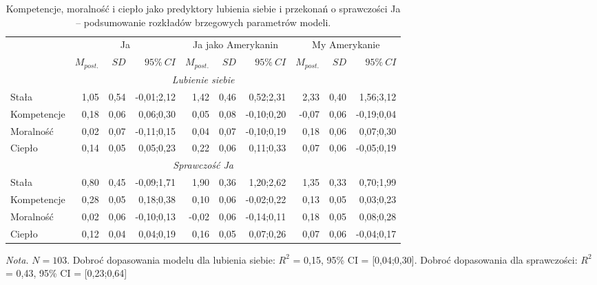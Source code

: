 \documentclass[man]{apa6}
\begin{document}
\begin{table*}[htbp]
\vspace*{2em}
\centering
\begin{threeparttable}
\caption{Kompetencje, moralność i ciepło jako predyktory lubienia siebie i przekonań o sprawczości Ja -- podsumowanie rozkładów brzegowych parametrów modeli.}
\label{tab:2}
\bgroup
\def\tabcolsep{4pt}
\begin{tabular}{lrrrrrrrrr}
\midrule
 &
\multicolumn{3}{c}{Ja} &
\multicolumn{3}{c}{Ja jako Amerykanin} &
\multicolumn{3}{c}{My Amerykanie} \\
\cline{2-10}
 & $M_{post.}$    & $SD$   & $95\%\ CI$   & $M_{post.}$    & $SD$   & $95\%\ CI$   & $M_{post.}$    & $SD$   & $95\%\ CI$   \\
\midrule
 \multicolumn{10}{c}{\emph{Lubienie siebie}}  \\
 Stała       &  1,05 & 0,54 & -0,01;2,12 &  1,42 & 0,46 &  0,52;2,31 &  2,33 & 0,40 &  1,56;3,12 \\
 Kompetencje &  0,18 & 0,06 &  0,06;0,30 &  0,05 & 0,08 & -0,10;0,20 & -0,07 & 0,06 & -0,19;0,04 \\
 Moralność   &  0,02 & 0,07 & -0,11;0,15 &  0,04 & 0,07 & -0,10;0,19 &  0,18 & 0,06 &  0,07;0,30 \\
 Ciepło      &  0,14 & 0,05 &  0,05;0,23 &  0,22 & 0,06 &  0,11;0,33 &  0,07 & 0,06 & -0,05;0,19 \\
 \multicolumn{10}{c}{\emph{Sprawczość Ja}}  \\
 Stała       &  0,80 & 0,45 & -0,09;1,71 &  1,90 & 0,36 &  1,20;2,62 &  1,35 & 0,33 &  0,70;1,99 \\
 Kompetencje &  0,28 & 0,05 &  0,18;0,38 &  0,10 & 0,06 & -0,02;0,22 &  0,13 & 0,05 &  0,03;0,23 \\
 Moralność   &  0,02 & 0,06 & -0,10;0,13 & -0,02 & 0,06 & -0,14;0,11 &  0,18 & 0,05 &  0,08;0,28 \\
 Ciepło      &  0,12 & 0,04 &  0,04;0,19 &  0,16 & 0,05 &  0,07;0,26 &  0,07 & 0,06 & -0,04;0,17 \\
\bottomrule
\end{tabular}
\egroup
\begin{tablenotes}
{\small
\textit{Nota.} $N = 103$. Dobroć dopasowania modelu dla lubienia siebie: $R^2$ = 0,15, 95\% CI = [0,04;0,30]. Dobroć dopasowania dla sprawczości: $R^2$ = 0,43, 95\% CI = [0,23;0,64]
}
\end{tablenotes}
\end{threeparttable}
\end{table*}
\end{document}
